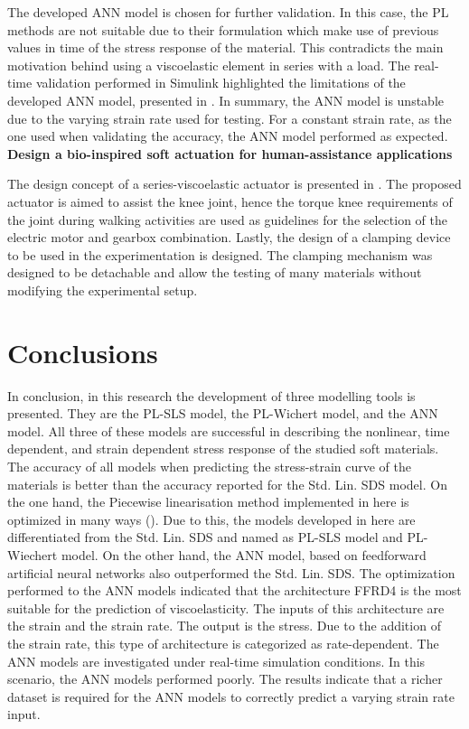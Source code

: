 The developed ANN model is chosen for further validation. In this case, the PL methods are not suitable due to their formulation which make use of previous values in time of the stress response of the material. This contradicts the main motivation behind using a viscoelastic element in series with a load. The real-time validation performed in Simulink highlighted the limitations of the developed ANN model, presented in . In summary, the ANN model is unstable due to the varying strain rate used for testing. For a constant strain rate, as the one used when validating the accuracy, the ANN model performed as expected.
\\[1em]
\noindent \textbf{\large{ Design a bio-inspired soft actuation for human-assistance applications}}

The design concept of a series-viscoelastic actuator is presented in . The proposed actuator is aimed to assist the knee joint, hence the torque knee requirements of the joint during walking activities are used as guidelines for the selection of the electric motor and gearbox combination. Lastly, the design of a clamping device to be used in the experimentation is designed. The clamping mechanism was designed to be detachable and allow the testing of many materials without modifying the experimental setup.

\section{Conclusions}

In conclusion, in this research the development of three modelling tools is presented. They are the PL-SLS model, the PL-Wichert model, and the ANN model. All three of these models are successful in describing the nonlinear, time dependent, and strain dependent stress response of the studied soft materials. The accuracy of all models when predicting the stress-strain curve of the materials is better than the accuracy reported for the Std. Lin. SDS model. On the one hand, the Piecewise linearisation method implemented in here is optimized in many ways (). Due to this, the models developed in here are differentiated from the Std. Lin. SDS and named as PL-SLS model and PL-Wiechert model. On the other hand, the ANN model, based on feedforward artificial neural networks also outperformed the Std. Lin. SDS. The optimization performed to the ANN models indicated that the architecture FFRD4 is the most suitable for the prediction of viscoelasticity. The inputs of this architecture are the strain and the strain rate. The output is the stress. Due to the addition of the strain rate, this type of architecture is categorized as rate-dependent. The ANN models are investigated under real-time simulation conditions. In this scenario, the ANN models performed poorly. The results indicate that a richer dataset is required for the ANN models to correctly predict a varying strain rate input.

